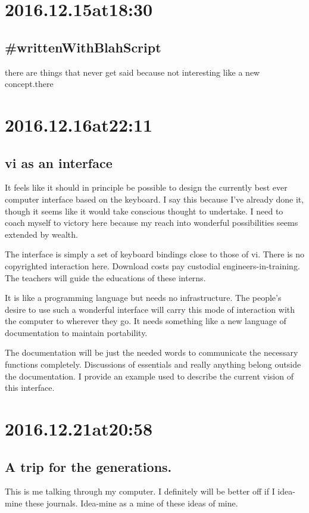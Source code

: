 \begin{enumerate}
\begin{enumerate}
\section*{ 2016.12.15at18:30 }
\subsection*{ #writtenWithBlahScript }
there are things that never get said because not interesting like a new concept.there

\section*{ 2016.12.16at22:11 }
\subsection*{ vi as an interface }
It feels like it should in principle be possible to design the currently best ever computer interface based on the keyboard.  
I say this because I've already done it, though it seems like it would take conscious thought to undertake.
I need to coach myself to victory here because my reach into wonderful possibilities seems extended by wealth.

The interface is simply a set of keyboard bindings close to those of vi.
There is no copyrighted interaction here.
Download costs pay custodial engineers-in-training.
The teachers will guide the educations of these interns.

It is like a programming language but needs no infrastructure.
The people's desire to use such a wonderful interface will carry this mode of interaction with the computer to wherever they go.
It needs something like a new language of documentation to maintain portability.

The documentation will be just the needed words to communicate the necessary functions completely. Discussions of essentials and really anything belong outside the documentation. I provide an example used to describe the current vision of this interface.

\section*{ 2016.12.21at20:58 }
\subsection*{ A trip for the generations. }
This is me talking through my computer. I definitely will be better off if I idea-mine these journals. Idea-mine as a mine of these ideas of mine.


\end{enumerate}
\end{enumerate}
